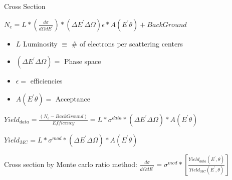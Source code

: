 \documentclass{beamer}
\begin{document}
\begin{frame}{Cross Section}
	\begin{block}{}
		\centering
		 $N_e = \textit{L} * \left( \frac{d\sigma}{d\Omega dE^\prime} \right) * \left( \Delta E^\prime \Delta \Omega\right) \epsilon * A \left(E^\prime \theta \right)  + Back  Ground$
		
		\begin{itemize}
			\item $\textit{L}$ Luminosity $\equiv$ \# of electrons per scattering centers
			\item $\left( \Delta E^\prime \Delta \Omega\right) = $ Phase space
			\item $\epsilon = $ efficiencies
			\item  $A \left(E^\prime \theta \right) =$ Acceptance 
			
		\end{itemize}
		
		$ Yield_{data} = \frac{\left(N_e - BackGround\right)}{Efficency } =  \textit{L} *\sigma^{data} * \left( \Delta E^\prime \Delta \Omega\right)*  A \left(E^\prime \theta \right)$
		
		$ Yield_{MC} = \textit{L} *\sigma^{mod} * \left( \Delta E^\prime \Delta \Omega\right)*  A \left(E^\prime \theta \right)$
	\end{block}



	\begin{center}

	\begin{block}{}
		Cross section by Monte carlo ratio  method:
\centering $ \frac{d\sigma}{d\Omega dE^\prime} = \sigma^{mod} * \left[\frac{Yield_{data} \left( 
E^\prime,\theta\right)} {Yield_{MC}\left(E^\prime,\theta\right)}\right] $

	\end{block}	
	\end{center}



\end{frame}
\end{document}
